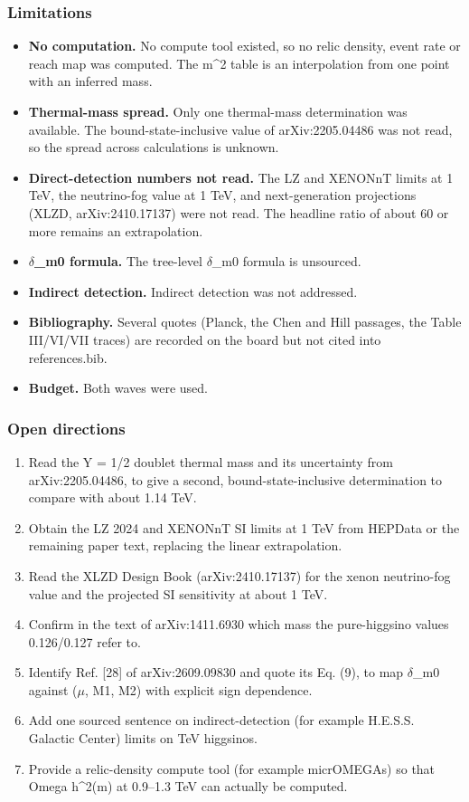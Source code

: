 \documentclass[11pt,a4paper]{article}
\begin{document}
\subsubsection*{Limitations}
\begin{itemize}
  \item \textbf{No computation.} No compute tool existed, so no relic density, event rate or reach map was computed. The m\textasciicircum{}2 table is an interpolation from one point with an inferred mass.
  \item \textbf{Thermal-mass spread.} Only one thermal-mass determination was available. The bound-state-inclusive value of arXiv:2205.04486 was not read, so the spread across calculations is unknown.
  \item \textbf{Direct-detection numbers not read.} The LZ and XENONnT limits at 1 TeV, the neutrino-fog value at 1 TeV, and next-generation projections (XLZD, arXiv:2410.17137) were not read. The headline ratio of about 60 or more remains an extrapolation.
  \item \textbf{$\delta$\_m0 formula.} The tree-level $\delta$\_m0 formula is unsourced.
  \item \textbf{Indirect detection.} Indirect detection was not addressed.
  \item \textbf{Bibliography.} Several quotes (Planck, the Chen and Hill passages, the Table III/VI/VII traces) are recorded on the board but not cited into references.bib.
  \item \textbf{Budget.} Both waves were used.
\end{itemize}
\subsubsection*{Open directions}
\begin{enumerate}
  \item Read the Y = 1/2 doublet thermal mass and its uncertainty from arXiv:2205.04486, to give a second, bound-state-inclusive determination to compare with about 1.14 TeV.
  \item Obtain the LZ 2024 and XENONnT SI limits at 1 TeV from HEPData or the remaining paper text, replacing the linear extrapolation.
  \item Read the XLZD Design Book (arXiv:2410.17137) for the xenon neutrino-fog value and the projected SI sensitivity at about 1 TeV.
  \item Confirm in the text of arXiv:1411.6930 which mass the pure-higgsino values 0.126/0.127 refer to.
  \item Identify Ref. [28] of arXiv:2609.09830 and quote its Eq. (9), to map $\delta$\_m0 against ($\mu$, M1, M2) with explicit sign dependence.
  \item Add one sourced sentence on indirect-detection (for example H.E.S.S. Galactic Center) limits on TeV higgsinos.
  \item Provide a relic-density compute tool (for example micrOMEGAs) so that Omega h\textasciicircum{}2(m) at 0.9--1.3 TeV can actually be computed.
\end{enumerate}
\end{document}
